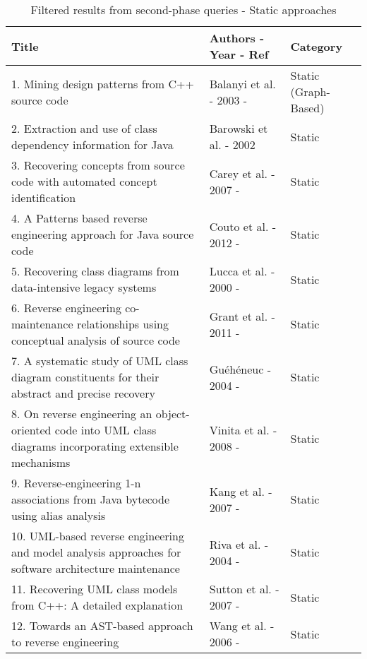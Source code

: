 \begin{table}[h]
\caption{Filtered results from second-phase queries - Static approaches}
\label{table:relatedPapers1}
\centering
\begin{tabular}{p{6cm}|p{5cm}|p{3cm}}
\toprule
\rowcolor[HTML]{BBDAFF}
\textbf{Title}  & \textbf{Authors - Year - Ref} & \textbf{Category} \\ \midrule
1. Mining design patterns from C++ source code & Balanyi et al. - 2003 - \cite{Balanyi2003} &  Static (Graph-Based)
\\ \hline
2. Extraction and use of class dependency information for Java & Barowski et al. - 2002 \cite{Barowski} & Static 
\\ \hline
3. Recovering concepts from source code with automated concept identification & Carey et al. - 2007 - \cite{recoveringconcepts} &  Static
\\ \hline
4. A Patterns based reverse engineering approach for Java source code & Couto et al. - 2012 - \cite{Couto2012} & Static
\\ \hline
5. Recovering class diagrams from data-intensive legacy systems & Lucca et al.  - 2000 - \citep{Lucca2000}  &  Static
\\ \hline
6. Reverse engineering co-maintenance relationships using conceptual analysis of source code & Grant et al. - 2011 - \cite{grant2011reverse} & Static
\\ \hline
7. A systematic study of UML class diagram constituents for their abstract and precise recovery & Guéhéneuc - 2004 - \cite{GueheneucSystematic} & Static
\\ \hline
8. On reverse engineering an object-oriented code into UML class diagrams incorporating extensible mechanisms & Vinita et al. - 2008 - \cite{Vinita2008} & Static
\\ \hline 
9. Reverse-engineering 1-n associations from Java bytecode using alias analysis & Kang et al. - 2007 - \cite{Kang2007} & Static
\\ \hline
10. UML-based reverse engineering and model analysis approaches for software architecture maintenance & Riva et al. - 2004 - \cite{1357789} & Static
\\ \hline
11. Recovering UML class models from C++: A detailed explanation & Sutton et al. - 2007 -  \cite{Sutton2007} & Static
\\ \hline
12. Towards an AST-based approach to reverse engineering & Wang et al. - 2006 - \cite{4054609} & Static
\\ \bottomrule
\end{tabular}
\end{table}

